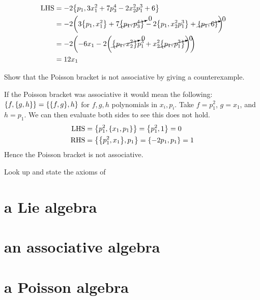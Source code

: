 \documentclass[boxes]{homework}
\makeatletter
\numberwithin{@problem}{section}
\makeatother
\begin{document}
\begin{solution}
	\begin{align*}
		\text{LHS} & = -2\pb{p_1}{3x_1^2 + 7p_3^4 - 2x_2^2p_1^3 + 6}                                                                  \\
		           & = -2\qty(3\pb{p_1}{x_1^2} + 7\cancelto{0}{\pb{p_1}{p_3^4}} - 2 \pb{p_1}{x_2^2p_1^3} + \cancelto{0}{\pb{p_1}{6}}) \\
		           & = -2\qty(-6x_1 - 2\qty(\cancelto{0}{\pb{p_1}{x_2^2}}p_1^3 + x_2^2\cancelto{0}{\pb{p_1}{p_1^3}}))                 \\
		           & = 12x_1
	\end{align*}
\end{solution}

\begin{problem}
Show that the Poisson bracket is not associative by giving a counterexample.
\end{problem}

\begin{solution}
	If the Poisson bracket was associative it would mean the following: $\pb{f}{\pb{g}{h}} = \pb{\pb{f}{g}}{h}$ for $f, g, h$ polynomials in $x_i, p_i$. Take $f = p_1^2$, $g = x_1$, and $h = p_1$. We can then evaluate both sides to see this does not hold.
	\begin{align*}
		\text{LHS} & = \pb{p_1^2}{\pb{x_1}{p_1}} = \pb{p_1^2}{1} = 0   \\
		\text{RHS} & = \pb{\pb{p_1^2}{x_1}}{p_1} = \pb{-2p_1}{p_1} = 1
	\end{align*}
	Hence the Poisson bracket is not associative.
\end{solution}

\begin{problem}
Look up and state the axioms of
\begin{parts}
	\part{a Lie algebra}\label{part:6a}
	\part{an associative algebra}\label{part:6b}
	\part{a Poisson algebra}\label{part:6c}
\end{parts}
\end{problem}
\end{document}
